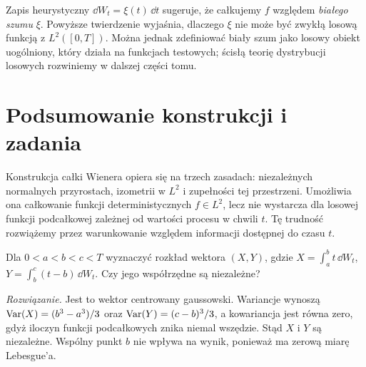 \begin{uwaga}
Zapis heurystyczny $\dd W_t=\xi(t)\,\dd t$ sugeruje,
że całkujemy $f$ względem \emph{białego szumu} $\xi$.
Powyższe twierdzenie wyjaśnia, dlaczego $\xi$ nie może
być zwykłą losową funkcją z $L^2([0,T])$. Można jednak
zdefiniować biały szum jako losowy obiekt uogólniony,
który działa na funkcjach testowych; ścisłą teorię
dystrybucji losowych rozwiniemy w dalszej części tomu.
\end{uwaga}

\section{Podsumowanie konstrukcji i zadania}
Konstrukcja całki Wienera opiera się na trzech zasadach:
niezależnych normalnych przyrostach, izometrii w $L^2$
i zupełności tej przestrzeni. Umożliwia ona całkowanie
funkcji deterministycznych $f\in L^2$, lecz nie wystarcza
dla losowej funkcji podcałkowej zależnej od wartości
procesu w chwili $t$. Tę trudność rozwiążemy przez
warunkowanie względem informacji dostępnej do czasu $t$.

\begin{zadanie}
Dla $0<a<b<c<T$ wyznaczyć rozkład wektora
$(X,Y)$, gdzie $X=\int_a^b t\,\dd W_t$,
$Y=\int_b^c (t-b)\,\dd W_t$. Czy jego współrzędne
są niezależne?

\emph{Rozwiązanie.} Jest to wektor centrowany gaussowski.
Wariancje wynoszą $\operatorname{Var}(X)=(b^3-a^3)/3$ oraz
$\operatorname{Var}(Y)=(c-b)^3/3$, a kowariancja jest równa zero,
gdyż iloczyn funkcji podcałkowych znika niemal wszędzie.
Stąd $X$ i $Y$ są niezależne. Wspólny punkt $b$ nie
wpływa na wynik, ponieważ ma zerową miarę Lebesgue'a.
\end{zadanie}

